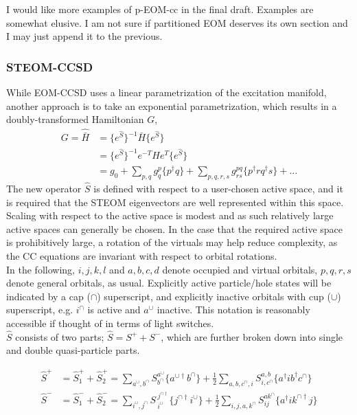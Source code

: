 I would like more examples of p-EOM-cc in the final draft. Examples are somewhat elusive. I am not sure if partitioned EOM deserves its own section and I may just append it to the previous.  


\subsubsection{STEOM-CCSD}
While EOM-CCSD uses a linear parametrization of the excitation manifold, another approach is to take an exponential parametrization, which results in a doubly-transformed Hamiltonian $G$,
\begin{align}
G =  \hat{\bar{H}} &= \{e^{\hat{S}}\}^{-1} \bar{H} \{e^{\hat{S}}\}\\
 &= \{e^{\hat{S}}\}^{-1} e ^{-T}H e^T \{e^{\hat{S}}\} \\
& = g_0 + \sum_{p,q}g^p_q \{p^\dag q \} + \sum_{p,q,r,s} g_{rs}^{pq}\{p^\dag r q^\dag s\} + \dots
\end{align}
The new operator $\hat{S}$ is defined with respect to a user-chosen active space, and it is required that the STEOM eigenvectors are well represented within this space. Scaling with respect to the active space is modest and as such relatively large active spaces can generally be chosen. In the case that the required active space is prohibitively large, a rotation of the virtuals may help reduce complexity, as the CC equations are invariant with respect to orbital rotations.\\

In the following, $i,j,k,l$ and $a,b,c,d$ denote occupied and virtual orbitals, $p,q,r,s$ denote general orbitals, as usual. Explicitly active particle/hole states will be indicated by a cap ($\cap$) superscript, and explicitly inactive orbitals with cup ($\cup$) superscript, e.g. $i^{\cap}$ is active and $a^{\cup}$ inactive. This notation is reasonably accessible if thought of in terms of light switches. \\
$\hat{S}$ consists of two parts; $\hat{S} = {S}^+ + {S}^-$, which are further broken down into single and double quasi-particle parts.  

\begin{align}
\hat{S}^+ &= \hat{S}^+_1 + \hat{S}^+_2 =  \sum_{a^{\cup}, b^{\cap}} S^{a^{\cup}}_{b^{\cap}} \{a^{\cup\dag} b^{\cap} \} + \frac{1}{2} \sum_{a,b,c^{\cap},i} S^{a,b}_{i,c^{\cap}} \{a^\dag i b^{\dag} c^{\cap}\} \\
\hat{S}^- &= \hat{S}^-_1 + \hat{S}^-_2 = \sum_{i^{\cup}, j^{\cap}}  S\,^{j^{\cap\dag}}_{i^{\cup}} \{j^{\cap\dag} i^{\cup} \}  + \frac{1}{2}\sum_{i, j, a, k^{\cap}} S^{ak^\cap}_{ij} \{ a^{\dag} i k^{\cap\dag} j \} 
\end{align}  

